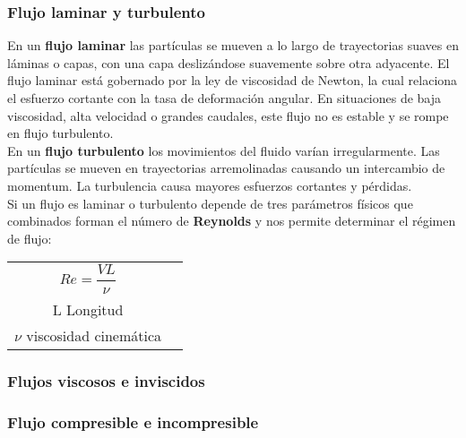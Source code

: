 \subsubsection{Flujo laminar y turbulento}
En un \textbf{flujo laminar} las partículas se mueven a lo largo de trayectorias suaves en láminas o capas, con una capa deslizándose suavemente sobre otra adyacente. El flujo laminar está gobernado por la ley de viscosidad de Newton, la cual relaciona el esfuerzo cortante con la tasa de deformación angular. En situaciones de baja viscosidad, alta velocidad o grandes caudales, este flujo no es estable y se rompe en flujo turbulento.\\

En un \textbf{flujo turbulento} los movimientos del fluido varían irregularmente. Las partículas se mueven en trayectorias arremolinadas causando un intercambio de momentum. La turbulencia causa mayores esfuerzos cortantes y pérdidas.\\

Si un flujo es laminar o turbulento depende de tres parámetros físicos que combinados forman el número de \textbf{Reynolds} y nos permite determinar el régimen de flujo:\\

\begin{tabular}{c c}
		\begin{minipage}[t]{.45\textwidth}
			\flushright 
			\vspace{.05cm}
			$Re= \dfrac{V L}{\nu}$
		\end{minipage}
		&
		\begin{minipage}[t]{.45\textwidth}
			\flushleft
			V velocidad\\
			L Longitud\\
			$\nu$ viscosidad cinemática
		\end{minipage}
\end{tabular}

\subsubsection{Flujos viscosos e inviscidos}
\subsubsection{Flujo compresible e incompresible}
		



